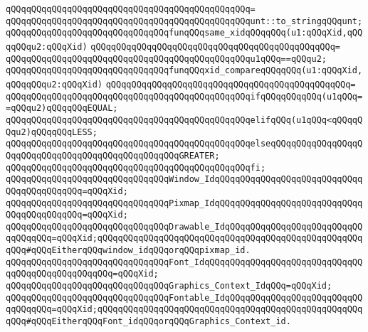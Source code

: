 \verb|qQQqqQQqqQQqqQQqqQQqqQQqqQQqqQQqqQQqqQQqqQQqqQQq=|\newline
\verb|qQQqqQQqqQQqqQQqqQQqqQQqqQQqqQQqqQQqqQQqqQQqqQQqunt::to_stringqQQqunt;|\newline
\newline
\verb|qQQqqQQqqQQqqQQqqQQqqQQqqQQqqQQqfunqQQqsame_xidqQQqqQQq(u1:qQQqXid,qQQqqQQqu2:qQQqXid)|\newline
\verb|qQQqqQQqqQQqqQQqqQQqqQQqqQQqqQQqqQQqqQQqqQQqqQQq=|\newline
\verb|qQQqqQQqqQQqqQQqqQQqqQQqqQQqqQQqqQQqqQQqqQQqqQQqu1qQQq==qQQqu2;|\newline
\newline
\verb|qQQqqQQqqQQqqQQqqQQqqQQqqQQqqQQqfunqQQqxid_compareqQQqqQQq(u1:qQQqXid,qQQqqQQqu2:qQQqXid)|\newline
\verb|qQQqqQQqqQQqqQQqqQQqqQQqqQQqqQQqqQQqqQQqqQQqqQQq=|\newline
\verb|qQQqqQQqqQQqqQQqqQQqqQQqqQQqqQQqqQQqqQQqqQQqqQQqifqQQqqQQqqQQq(u1qQQq==qQQqu2)qQQqqQQqEQUAL;|\newline
\verb|qQQqqQQqqQQqqQQqqQQqqQQqqQQqqQQqqQQqqQQqqQQqqQQqelifqQQq(u1qQQq<qQQqqQQqu2)qQQqqQQqLESS;|\newline
\verb|qQQqqQQqqQQqqQQqqQQqqQQqqQQqqQQqqQQqqQQqqQQqqQQqelseqQQqqQQqqQQqqQQqqQQqqQQqqQQqqQQqqQQqqQQqqQQqqQQqqQQqGREATER;|\newline
\verb|qQQqqQQqqQQqqQQqqQQqqQQqqQQqqQQqqQQqqQQqqQQqqQQqfi;|\newline
\newline
\verb|qQQqqQQqqQQqqQQqqQQqqQQqqQQqqQQqWindow_IdqQQqqQQqqQQqqQQqqQQqqQQqqQQqqQQqqQQqqQQqqQQq=qQQqXid;|\newline
\verb|qQQqqQQqqQQqqQQqqQQqqQQqqQQqqQQqPixmap_IdqQQqqQQqqQQqqQQqqQQqqQQqqQQqqQQqqQQqqQQqqQQq=qQQqXid;|\newline
\verb|qQQqqQQqqQQqqQQqqQQqqQQqqQQqqQQqDrawable_IdqQQqqQQqqQQqqQQqqQQqqQQqqQQqqQQqqQQq=qQQqXid;qQQqqQQqqQQqqQQqqQQqqQQqqQQqqQQqqQQqqQQqqQQqqQQqqQQqqQQq#qQQqEitherqQQqwindow_idqQQqorqQQqpixmap_id.|\newline
\verb|qQQqqQQqqQQqqQQqqQQqqQQqqQQqqQQqFont_IdqQQqqQQqqQQqqQQqqQQqqQQqqQQqqQQqqQQqqQQqqQQqqQQqqQQq=qQQqXid;|\newline
\verb|qQQqqQQqqQQqqQQqqQQqqQQqqQQqqQQqGraphics_Context_IdqQQq=qQQqXid;|\newline
\verb|qQQqqQQqqQQqqQQqqQQqqQQqqQQqqQQqFontable_IdqQQqqQQqqQQqqQQqqQQqqQQqqQQqqQQqqQQq=qQQqXid;qQQqqQQqqQQqqQQqqQQqqQQqqQQqqQQqqQQqqQQqqQQqqQQqqQQqqQQq#qQQqEitherqQQqFont_idqQQqorqQQqGraphics_Context_id.|\newline
